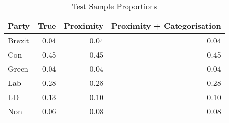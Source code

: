 \begin{table}[H]
\centering
\caption{Test Sample Proportions} 
\begin{tabular}{lrrr}
  \hline
Party & True & Proximity & Proximity + Categorisation \\ 
  \hline
Brexit & 0.04 & 0.04 & 0.04 \\ 
  Con & 0.45 & 0.45 & 0.45 \\ 
  Green & 0.04 & 0.04 & 0.04 \\ 
  Lab & 0.28 & 0.28 & 0.28 \\ 
  LD & 0.13 & 0.10 & 0.10 \\ 
  Non & 0.06 & 0.08 & 0.08 \\ 
   \hline
\end{tabular}
\end{table}
